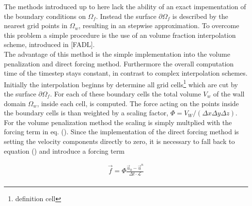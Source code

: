 The methods introduced up to here lack the ability of an exact impementation of the boundary conditions on $\Omega_f$.
Instead the surface $\partial \Omega_f$ is described by the nearest grid points in $\Omega_w$, resulting in an
stepwise approximation.
To overcome this problem a simple procedure is the use of an volume fraction interpolation scheme, introduced in [FADL].\\
The advantage of this method is the simple implementation into the volume penalization and direct forcing method.
Furthermore the overall computation time of the timestep stays constant, in  contrast to complex interpolation schemes.\\
Initially the interpolation beginns by determine all grid cells\footnote{definition cell} which are cut by the surface $\partial \Omega_f$.
For each of these boundary cells the total volume $V_w$ of the wall domain $\Omega_w$, inside each cell, is computed.
The force acting on the points inside the boundary cells is than weighted by a scaling factor, $\Phi = V_W/(\Delta x \Delta y \Delta z)$.
For the volume penalization method the scaling is simply multplied with the forcing term in eq. ().
Since the implementation of the direct forcing method is setting the velocity components directly to zero, it is necessary to
fall back to equation () and introduce a forcing term

\begin{align}
    \vec{f} = \Phi \frac{\vec{u}_0 -\vec{u}^n}{\Delta t\cdot \mathscr{L}}\\
\end{align}

